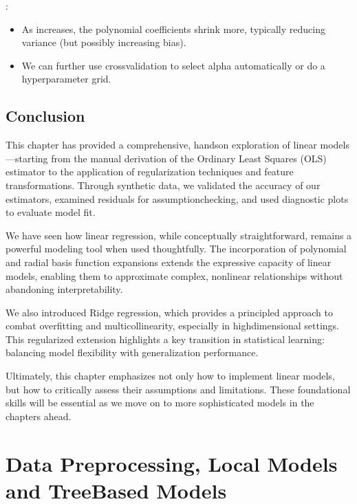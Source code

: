\documentclass[letterpaper,10pt,english]{jupyterBook}
\begin{document}
\sphinxAtStartPar
{}:
\begin{itemize}
\item {} 
\sphinxAtStartPar
As  increases, the polynomial coefficients shrink more, typically reducing variance (but possibly increasing bias).

\item {} 
\sphinxAtStartPar
We can further use cross\sphinxhyphen{}validation to select alpha automatically or do a hyperparameter grid.

\end{itemize}


\section{Conclusion}
\label{\detokenize{02:conclusion}}
\sphinxAtStartPar
This chapter has provided a comprehensive, hands\sphinxhyphen{}on exploration of linear models—starting from the manual derivation of the Ordinary Least Squares (OLS) estimator to the application of regularization techniques and feature transformations. Through synthetic data, we validated the accuracy of our estimators, examined residuals for assumption\sphinxhyphen{}checking, and used diagnostic plots to evaluate model fit.

\sphinxAtStartPar
We have seen how linear regression, while conceptually straightforward, remains a powerful modeling tool when used thoughtfully. The incorporation of polynomial and radial basis function expansions extends the expressive capacity of linear models, enabling them to approximate complex, non\sphinxhyphen{}linear relationships without abandoning interpretability.

\sphinxAtStartPar
We also introduced Ridge regression, which provides a principled approach to combat overfitting and multicollinearity, especially in high\sphinxhyphen{}dimensional settings. This regularized extension highlights a key transition in statistical learning: balancing model flexibility with generalization performance.

\sphinxAtStartPar
Ultimately, this chapter emphasizes not only how to implement linear models, but how to critically assess their assumptions and limitations. These foundational skills will be essential as we move on to more sophisticated models in the chapters ahead.

\sphinxstepscope


\chapter{Data Preprocessing, Local Models and Tree\sphinxhyphen{}Based Models}
\label{\detokenize{03:data-preprocessing-local-models-and-tree-based-models}}\label{\detokenize{03::doc}}
\end{document}
